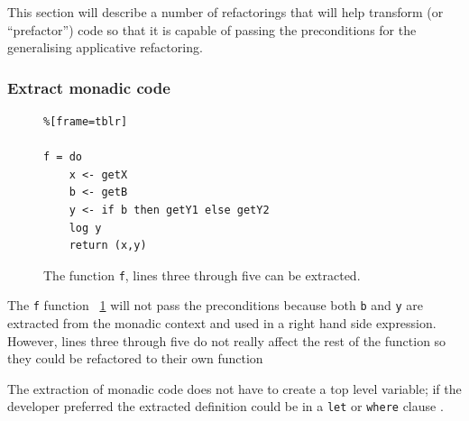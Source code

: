 This section will describe a number of refactorings that will help transform (or ``prefactor'') code so that it is capable of passing the preconditions for the generalising applicative refactoring. 

\subsubsection{Extract monadic code}
\label{subSec:extract}

\begin{figure}[t]
\begin{lstlisting}%[frame=tblr]

f = do
	x <- getX
	b <- getB
	y <- if b then getY1 else getY2
	log y
	return (x,y)	
\end{lstlisting}
\caption{The function \texttt{f}, lines three through five can be extracted.}
\label{fMonad}
\end{figure}


The \texttt{f} function \DIFdelbegin {}\DIFdelend \DIFaddbegin {}\DIFaddend ~\ref{fMonad} will not pass the preconditions because both \texttt{b} and \texttt{y} are extracted from the monadic context and used in a right hand side expression. However, lines three through five do not really affect the rest of the function so they could be refactored to their own function\DIFdelbegin {}\DIFdelend \DIFaddbegin {}\texttt{}\texttt{} \texttt{} \DIFaddend 

The extraction of monadic code does not have to create a top level variable; if the developer preferred the extracted definition could be in a \texttt{let} or \texttt{where} clause \DIFaddbegin {}\DIFaddend .

\DIFdelbegin %


